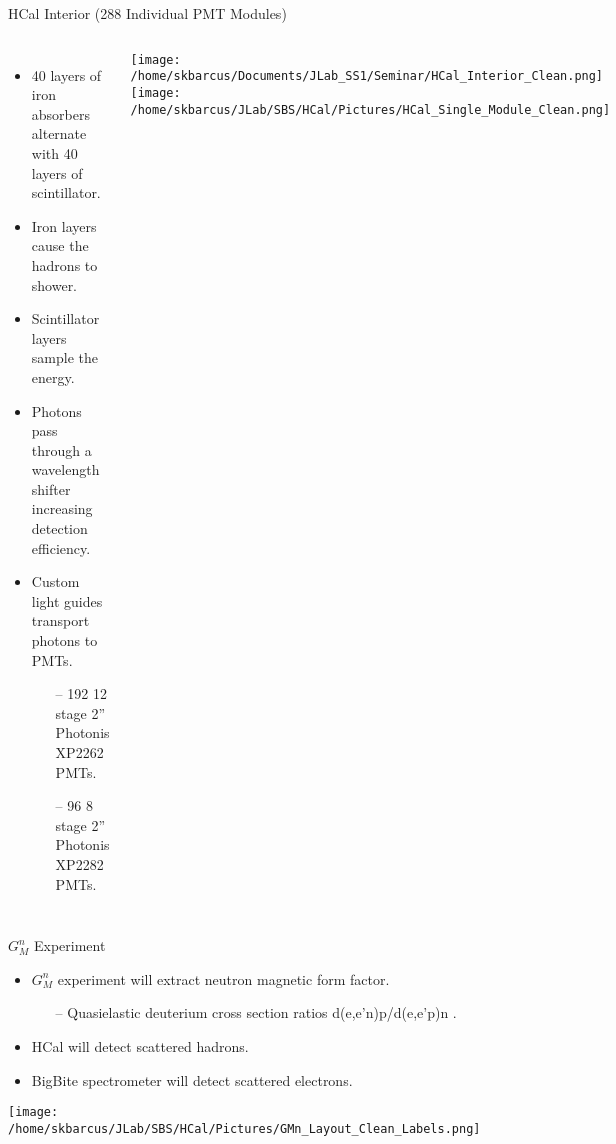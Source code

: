 \documentclass[10pt]{beamer}
\begin{document}
\begin{frame}{HCal Interior (288 Individual PMT Modules)}

    \begin{columns}[T,onlytextwidth]
  	
  	\begin{itemize}
  		\item 40 layers of iron absorbers alternate with 40 layers of scintillator.
		\item Iron layers cause the hadrons to shower. 
		\item Scintillator layers sample the energy.
		\item Photons pass through a wavelength shifter increasing detection efficiency.
		\item Custom light guides transport photons to PMTs.
			\begin{itemize}
				\item[--] 192 12 stage 2'' Photonis XP2262 PMTs.
				\item[--] 96 8 stage 2'' Photonis XP2282 PMTs.
			\end{itemize}
  	\end{itemize}

  	
  	\begin{center}
  		\vspace{5mm}
  		\texttt{[image: /home/skbarcus/Documents/JLab\_SS1/Seminar/HCal\_Interior\_Clean.png]}
		\vspace{10mm}
  		\texttt{[image: /home/skbarcus/JLab/SBS/HCal/Pictures/HCal\_Single\_Module\_Clean.png]}
  	\end{center}
  	
	\end{columns}
	
\end{frame}

\begin{frame}{$G_M^n$ Experiment}

	\begin{itemize}
		\item $G_M^n$ experiment will extract neutron magnetic form factor.
		\begin{itemize}
			\item[--] Quasielastic deuterium cross section ratios d(e,e'n)p/d(e,e'p)n \parencite{gmn_slides,gmn}.
		\end{itemize}		 
		\item HCal will detect scattered hadrons.
		\item BigBite spectrometer will detect scattered electrons.
	\end{itemize}

	\begin{center}
		\texttt{[image: /home/skbarcus/JLab/SBS/HCal/Pictures/GMn\_Layout\_Clean\_Labels.png]}
	\end{center}

\end{frame}
\end{document}
